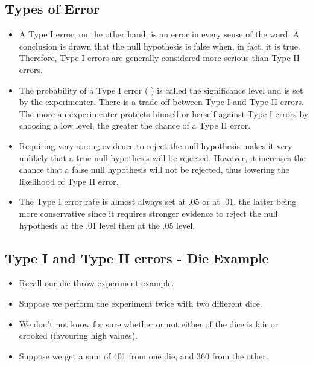 \documentclass[]{report}
\begin{document}

\subsection{Types of Error}
\begin{itemize}
\item
A Type I error, on the other hand, is an error in every sense of the word. A conclusion is drawn that the null hypothesis is false when, in fact, it is true. Therefore, Type I errors are generally considered more serious than Type II errors.
\item
The probability of a Type I error ( ) is called the significance level and is set by the experimenter. There is a trade-off between Type I and Type II errors. The more an experimenter protects himself or herself against Type I errors by choosing a low level, the greater the chance of a Type II error.
\item
Requiring very strong evidence to reject the null hypothesis makes it very unlikely that a true null hypothesis will be rejected. However, it increases the chance that a false null hypothesis will not be rejected, thus lowering the likelihood of Type II error.
\item
The Type I error rate is almost always set at .05 or at .01, the latter being more conservative since it requires stronger evidence to reject the null hypothesis at the .01 level then at the .05 level.
\end{itemize}


\subsection{Type I and Type II errors - Die Example}
\begin{itemize}
\item Recall our die throw experiment example.
\item Suppose we perform the experiment twice with two different dice.
\item We don't not know for sure whether or not either of the dice is fair or crooked (favouring high values).
\item Suppose we get a sum of 401 from one die, and 360 from the other.
\end{itemize}
\end{document}
